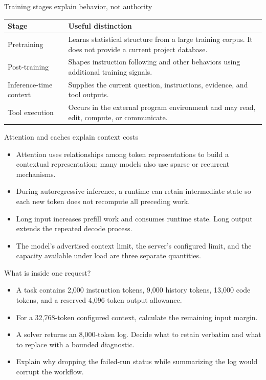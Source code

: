 \documentclass[aspectratio=169,11pt]{beamer}
\begin{document}
\begin{frame}[t,fragile]{Training stages explain behavior, not authority}
\fontsize{10.5}{12.5}\selectfont\setlength{\tabcolsep}{4pt}\renewcommand{\arraystretch}{1.15}
\begin{tabular}{>{\raggedright\arraybackslash}p{}>{\raggedright\arraybackslash}p{}}
\toprule
\textbf{Stage} & \textbf{Useful distinction} \\ \midrule
Pretraining & Learns statistical structure from a large training corpus. It does not provide a current project database. \\[2pt]
Post-training & Shapes instruction following and other behaviors using additional training signals. \\[2pt]
Inference-time context & Supplies the current question, instructions, evidence, and tool outputs. \\[2pt]
Tool execution & Occurs in the external program environment and may read, edit, compute, or communicate. \\[2pt]
\bottomrule\end{tabular}\par\vspace{2mm}
\end{frame}
\begin{frame}[t,fragile]{Attention and caches explain context costs}
\fontsize{11.5}{14}\selectfont
\begin{itemize}\setlength{\itemsep}{2mm}
\item Attention uses relationships among token representations to build a contextual representation; many models also use sparse or recurrent mechanisms.
\item During autoregressive inference, a runtime can retain intermediate state so each new token does not recompute all preceding work.
\item Long input increases prefill work and consumes runtime state. Long output extends the repeated decode process.
\item The model's advertised context limit, the server's configured limit, and the capacity available under load are three separate quantities.
\end{itemize}
\end{frame}
\begin{frame}[t,fragile]{What is inside one request?}
\fontsize{11.5}{14}\selectfont
\begin{itemize}\setlength{\itemsep}{2mm}
\item A task contains 2,000 instruction tokens, 9,000 history tokens, 13,000 code tokens, and a reserved 4,096-token output allowance.
\item For a 32,768-token configured context, calculate the remaining input margin.
\item A solver returns an 8,000-token log. Decide what to retain verbatim and what to replace with a bounded diagnostic.
\item Explain why dropping the failed-run status while summarizing the log would corrupt the workflow.
\end{itemize}
\end{frame}
\end{document}
